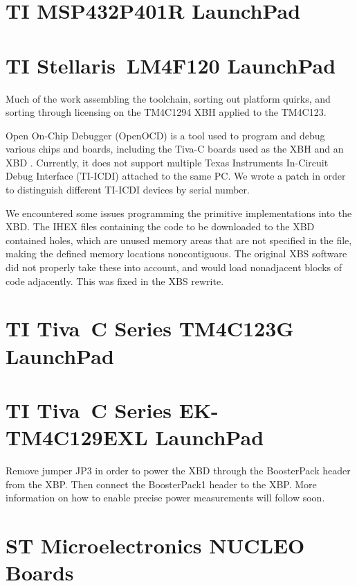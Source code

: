 \documentclass[twoside,11pt]{cergdoc}
\begin{document}
  \section{TI MSP432P401R LaunchPad\texttrademark}
  \section{TI Stellaris\textregistered~LM4F120 LaunchPad}
Much of the work assembling the toolchain, sorting out platform quirks, and
sorting through licensing on the TM4C1294 XBH applied to the TM4C123.

Open On-Chip Debugger (OpenOCD) is a tool used to program and debug various
chips and boards, including the Tiva-C boards used as the XBH and an XBD
\cite{openocd}. Currently, it does not support multiple Texas Instruments
In-Circuit Debug Interface (TI-ICDI) attached to the
same PC. We wrote a patch \cite{openocd_patch} in order to distinguish different
TI-ICDI devices by serial number. 

We encountered some issues programming the primitive implementations into the
XBD. The IHEX files containing the code to be downloaded to the XBD contained holes, which
are unused memory areas that are not specified in the file, making the defined
memory locations noncontiguous. The original XBS software did not properly take
these into account, and would load nonadjacent blocks of code adjacently. This
was fixed in the XBS rewrite. 

  \section{TI Tiva\texttrademark~C Series TM4C123G LaunchPad}
  \section{TI Tiva\texttrademark~C Series EK-TM4C129EXL LaunchPad}
Remove jumper JP3 in order to power the XBD through the BoosterPack header from the XBP.
Then connect the BoosterPack1 header to the XBP. More information on how to enable precise power measurements
will follow soon.

  \section{ST Microelectronics NUCLEO Boards}
\end{document}
